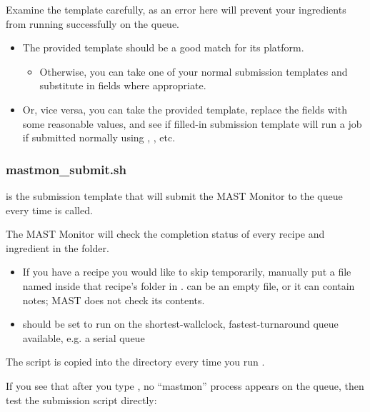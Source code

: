 \documentclass[letterpaper,10pt,english]{sphinxmanual}
\begin{document}
Examine the template carefully, as an error here will prevent your ingredients from running successfully on the queue.
\begin{itemize}
\item {} 
The provided template should be a good match for its platform.
\begin{itemize}
\item {} 
Otherwise, you can take one of your normal submission templates and substitute in  fields where appropriate.

\end{itemize}

\item {} 
Or, vice versa, you can take the provided template, replace the  fields with some reasonable values, and see if filled-in submission template will run a job if submitted normally using , , etc.

\end{itemize}


\subsubsection{mastmon\_submit.sh}
\label{1_0_installation:mastmon-submit-sh}
 is the submission template that will submit the MAST Monitor to the queue every time  is called.

The MAST Monitor will check the completion status of every recipe and ingredient in the  folder.
\begin{itemize}
\item {} 
If you have a recipe you would like to skip temporarily, manually put a file named  inside that recipe's folder in .  can be an empty file, or it can contain notes; MAST does not check its contents.

\item {} 
 should be set to run on the shortest-wallclock, fastest-turnaround queue available, e.g. a serial queue

\end{itemize}

The  script is copied into the  directory every time you run .

If you see that after you type , no ``mastmon'' process appears on the queue, then test the submission script directly:
\end{document}
